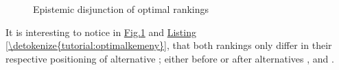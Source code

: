 \documentclass[a4paper,12pt,english]{sphinxhowto}
\begin{document}
\begin{figure}[H]
\centering
\capstart

\noindent{}
\caption{Epistemic disjunction of optimal  rankings}\label{\detokenize{tutorial:tutorialkemeny}}\end{figure}

It is interesting to notice in \hyperref[\detokenize{tutorial:tutorialkemeny}]{Fig.\@ \ref{\detokenize{tutorial:tutorialkemeny}}} and \hyperref[\detokenize{tutorial:optimalkemeny}]{Listing \ref{\detokenize{tutorial:optimalkemeny}}}, that both  rankings only differ in their respective positioning of alternative ; either before or after alternatives ,  and .
\end{document}
